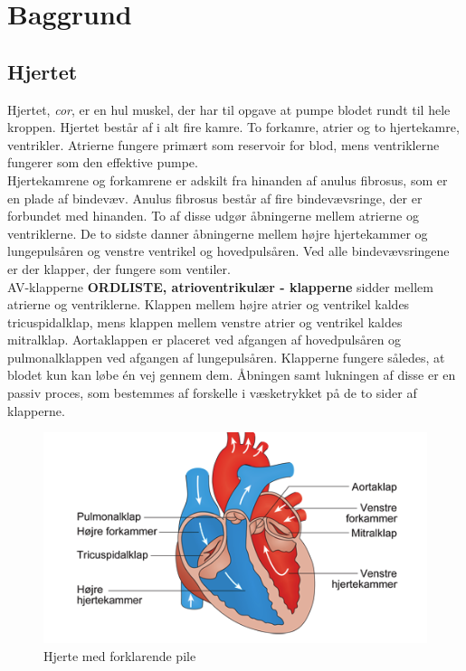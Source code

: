 \chapter{Baggrund}

\section{Hjertet}
Hjertet, \textit{cor}, er en hul muskel, der har til opgave at pumpe blodet rundt til hele kroppen. Hjertet består af i alt fire kamre. To forkamre, atrier og to hjertekamre, ventrikler. Atrierne fungere primært som reservoir for blod, mens ventriklerne fungerer som den effektive pumpe.\\
Hjertekamrene og forkamrene er adskilt fra hinanden af anulus fibrosus, som er en plade af bindevæv. Anulus fibrosus består af fire bindevævsringe, der er forbundet med hinanden. To af disse udgør åbningerne mellem atrierne og ventriklerne. De to sidste danner åbningerne mellem højre hjertekammer og lungepulsåren og venstre ventrikel og hovedpulsåren. Ved alle bindevævsringene er der klapper, der fungere som ventiler.\\ 
AV-klapperne \textbf{ORDLISTE, atrioventrikulær - klapperne} sidder mellem atrierne og ventriklerne. Klappen mellem højre atrier og ventrikel kaldes tricuspidalklap, mens klappen mellem venstre atrier og ventrikel kaldes mitralklap. Aortaklappen er placeret ved afgangen af hovedpulsåren og pulmonalklappen ved afgangen af lungepulsåren. Klapperne fungere således, at blodet kun kan løbe én vej gennem dem. Åbningen samt lukningen af disse er en passiv proces, som bestemmes af forskelle i væsketrykket på de to sider af klapperne.\\ 
\begin{figure}[htb]
	\centering
	\includegraphics[width=1\textwidth]{Figurer/Snip20150410_31}
	\caption{Hjerte med forklarende pile \protect\footnotemark} 
\end{figure}



